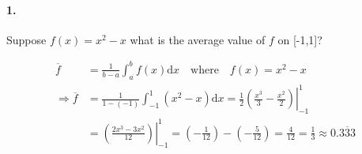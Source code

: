 


\renewcommand\assignment{Homework Set I, Due Monday, January 23rd, 2023}



    \iffalse
    \begin{equation*}
        \begin{gathered}
            Equations go here.
        \end{gathered}
    \end{equation*}

    \resizebox{\hsize}{!}{$Long equation goes here$}

    \begin{multicol*}{# of columns}
    \end{multicol*}

    \horizontal

    \fi


    \paragraph*{1.}
    Suppose $f(x) = x^2-x$ what is the average value of $f$ on [-1,1]?
    
    \begin{mdframed}
        \begin{align*}
                \overline{f} & = \frac{1}{b-a} \int_{a}^{b}f(x)\mathrm{d}x \quad \text{where} \quad f(x) = x^2-x   \\
                \Rightarrow\overline{f} & = \frac{1}{1-(-1)} \int_{-1}^{1}(x^2-x)\mathrm{d}x = \frac{1}{2}\left.\left(\frac{x^3}{3}-\frac{x^2}{2}\right)\right|_{-1}^{1}   \\
                & = \left.\left(\frac{2x^3-3x^2}{12}\right)\right|_{-1}^{1} = \left(-\frac{1}{12}\right) - \left(-\frac{5}{12}\right) = \frac{4}{12} = \boxed{\frac{1}{3} \approx 0.\overline{333}}
        \end{align*}
    \end{mdframed}


